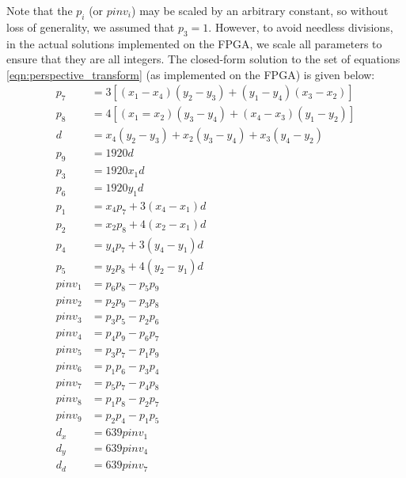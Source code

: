 \documentclass{article}
\begin{document}
Note that the $p_i$ (or $pinv_i$) may be scaled by an arbitrary constant, so without loss of generality, we assumed that $p_3 = 1$.
However, to avoid needless divisions, in the actual solutions implemented on the FPGA,
we scale all parameters to ensure that they are all integers.
The closed-form solution to the set of equations  \eqref{eqn:perspective_transform} (as implemented on the FPGA) is given below:
\begin{align}
    p_7 &= 3[(x_1 - x_4)(y_2 - y_3) + (y_1 - y_4)(x_3 - x_2)] \\
    p_8 &= 4[(x_1 = x_2)(y_3 - y_4) + (x_4 - x_3)(y_1 - y_2)] \\
    d &= x_4(y_2 - y_3) + x_2(y_3 - y_4) + x_3(y_4 - y_2) \\
    p_9 &= 1920 d \\
    p_3 &= 1920 x_1 d \\
    p_6 &= 1920 y_1 d \\
    p_1 &= x_4 p_7 + 3(x_4 - x_1)d \\
    p_2 &= x_2 p_8 + 4(x_2 - x_1)d \\
    p_4 &= y_4 p_7 + 3(y_4 - y_1)d \\
    p_5 &= y_2 p_8 + 4(y_2 - y_1)d \\
    pinv_1 &= p_6 p_8 - p_5 p_9 \\
    pinv_2 &= p_2 p_9 - p_3 p_8 \\
    pinv_3 &= p_3 p_5 - p_2 p_6 \\
    pinv_4 &= p_4 p_9 - p_6 p_7 \\
    pinv_5 &= p_3 p_7 - p_1 p_9 \\
    pinv_6 &= p_1 p_6 - p_3 p_4 \\
    pinv_7 &= p_5 p_7 - p_4 p_8 \\
    pinv_8 &= p_1 p_8 - p_2 p_7 \\
    pinv_9 &= p_2 p_4 - p_1 p_5 \\
    d_x &= 639 pinv_1 \\
    d_y &= 639 pinv_4 \\
    d_d &= 639 pinv_7
\end{align}
\end{document}
